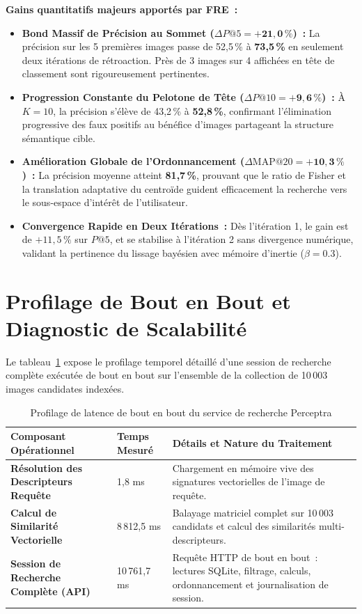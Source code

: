 \noindent\textbf{Gains quantitatifs majeurs apportés par FRE~:}
\begin{itemize}
    \item \textbf{Bond Massif de Précision au Sommet ($\Delta P@5 = \mathbf{+21,0\,\%}$)~:} La précision sur les 5 premières images passe de 52,5\,\% à \textbf{73,5\,\%} en seulement deux itérations de rétroaction. Près de 3 images sur 4 affichées en tête de classement sont rigoureusement pertinentes.
    \item \textbf{Progression Constante du Pelotone de Tête ($\Delta P@10 = \mathbf{+9,6\,\%}$)~:} À $K=10$, la précision s'élève de 43,2\,\% à \textbf{52,8\,\%}, confirmant l'élimination progressive des faux positifs au bénéfice d'images partageant la structure sémantique cible.
    \item \textbf{Amélioration Globale de l'Ordonnancement ($\Delta \text{MAP}@20 = \mathbf{+10,3\,\%}$)~:} La précision moyenne atteint \textbf{81,7\,\%}, prouvant que le ratio de Fisher et la translation adaptative du centroïde guident efficacement la recherche vers le sous-espace d'intérêt de l'utilisateur.
    \item \textbf{Convergence Rapide en Deux Itérations~:} Dès l'itération 1, le gain est de $+11,5\,\%$ sur $P@5$, et se stabilise à l'itération 2 sans divergence numérique, validant la pertinence du lissage bayésien avec mémoire d'inertie ($\beta = 0.3$).
\end{itemize}

\section{Profilage de Bout en Bout et Diagnostic de Scalabilité}

Le tableau~\ref{tab:profiling_e2e} expose le profilage temporel détaillé d'une session de recherche complète exécutée de bout en bout sur l'ensemble de la collection de 10\,003 images candidates indexées.

\begin{table}[H]
\centering
{}
\begin{tabularx}{\textwidth}{>{\bfseries}p{5.5cm}p{3.0cm}X}
\toprule
\rowcolor{TableHeader}
\color{white}Composant Opérationnel & \color{white}Temps Mesuré & \color{white}Détails et Nature du Traitement \\
\midrule
Résolution des Descripteurs Requête & 1,8 ms & Chargement en mémoire vive des signatures vectorielles de l'image de requête. \\
Calcul de Similarité Vectorielle & 8\,812,5 ms & Balayage matriciel complet sur 10\,003 candidats et calcul des similarités multi-descripteurs. \\
Session de Recherche Complète (API) & 10\,761,7 ms & Requête HTTP de bout en bout~: lectures SQLite, filtrage, calculs, ordonnancement et journalisation de session. \\
\bottomrule
\end{tabularx}
\caption{Profilage de latence de bout en bout du service de recherche Perceptra}
\label{tab:profiling_e2e}
\end{table}

